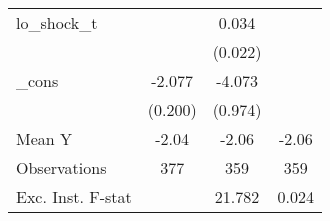 {\begin{tabular}{l*{3}{c}}
\addlinespace
lo\_shock\_t  &                     &       0.034         &                     \\
            &                     &     (0.022)         &                     \\
\addlinespace
\_cons      &      -2.077\sym{***}&      -4.073\sym{***}&                     \\
            &     (0.200)         &     (0.974)         &                     \\
\midrule
Mean Y      &       -2.04         &       -2.06         &       -2.06         \\
Observations&         377         &         359         &         359         \\
Exc. Inst. F-stat&                     &      21.782         &       0.024         \\
\bottomrule
\end{tabular}
}
